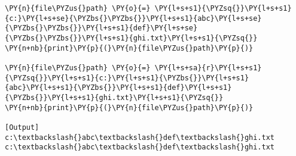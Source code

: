 \begin{Verbatim}[label=\makebox{\href{https://github.com/unipi-physics-labs/statnotes/tree/main/snippy/dos_path_escape_fix.py}{https://github.com/.../dos\_path\_escape\_fix.py}},commandchars=\\\{\}]
\PY{n}{file\PYZus{}path} \PY{o}{=} \PY{l+s+s1}{\PYZsq{}}\PY{l+s+s1}{c:}\PY{l+s+se}{\PYZbs{}\PYZbs{}}\PY{l+s+s1}{abc}\PY{l+s+se}{\PYZbs{}\PYZbs{}}\PY{l+s+s1}{def}\PY{l+s+se}{\PYZbs{}\PYZbs{}}\PY{l+s+s1}{ghi.txt}\PY{l+s+s1}{\PYZsq{}}
\PY{n+nb}{print}\PY{p}{(}\PY{n}{file\PYZus{}path}\PY{p}{)}

\PY{n}{file\PYZus{}path} \PY{o}{=} \PY{l+s+sa}{r}\PY{l+s+s1}{\PYZsq{}}\PY{l+s+s1}{c:}\PY{l+s+s1}{\PYZbs{}}\PY{l+s+s1}{abc}\PY{l+s+s1}{\PYZbs{}}\PY{l+s+s1}{def}\PY{l+s+s1}{\PYZbs{}}\PY{l+s+s1}{ghi.txt}\PY{l+s+s1}{\PYZsq{}}
\PY{n+nb}{print}\PY{p}{(}\PY{n}{file\PYZus{}path}\PY{p}{)}

[Output]
c:\textbackslash{}abc\textbackslash{}def\textbackslash{}ghi.txt
c:\textbackslash{}abc\textbackslash{}def\textbackslash{}ghi.txt
\end{Verbatim}
